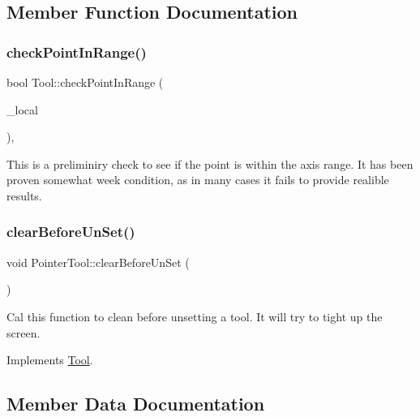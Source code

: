 \subsection{Member Function Documentation}
\mbox{\label{classTool_a81244366dc1b9f55465ed6f37b81033c}} 
\subsubsection{\texorpdfstring{check\+Point\+In\+Range()}{checkPointInRange()}}
{\footnotesize\ttfamily bool Tool\+::check\+Point\+In\+Range (\begin{DoxyParamCaption}\item[{const Q\+PointF \&}]{\+\_\+local }\end{DoxyParamCaption})\hspace{0.3cm}{\ttfamily [protected]}, {\ttfamily [inherited]}}

This is a preliminiry check to see if the point is within the axis range. It has been proven somewhat week condition, as in many cases it fails to provide realible results. \mbox{\label{classPointerTool_a04c325128dc9ee27272eace9e70d15aa}} 
\subsubsection{\texorpdfstring{clear\+Before\+Un\+Set()}{clearBeforeUnSet()}}
{\footnotesize\ttfamily void Pointer\+Tool\+::clear\+Before\+Un\+Set (\begin{DoxyParamCaption}{ }\end{DoxyParamCaption})\hspace{0.3cm}{\ttfamily [virtual]}}

Cal this function to clean before unsetting a tool. It will try to tight up the screen. 

Implements \mbox{\hyperlink{classTool_a7d9e7d03f4a34d71850cbbfc16ca8532}{Tool}}.



\subsection{Member Data Documentation}
\mbox{\label{classTool_a68be77a2e364a7b13d7206388ba5843e}} 
